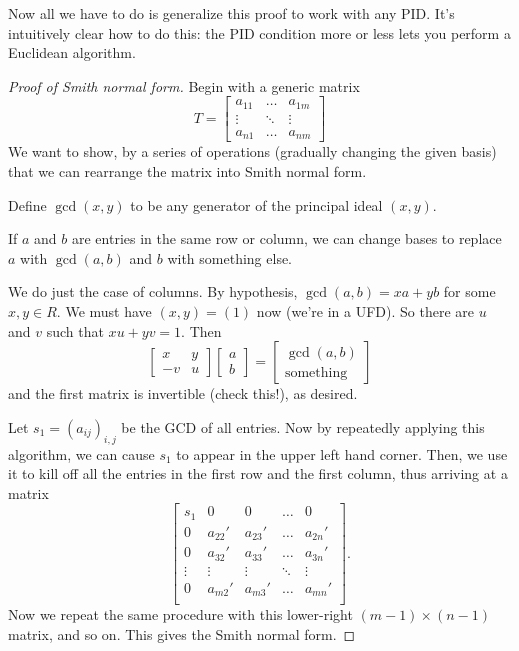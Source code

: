 Now all we have to do is generalize this proof to work
with any PID. It's intuitively clear how to do this:
the PID condition more or less lets you perform a Euclidean algorithm.

\begin{proof}
	[Proof of Smith normal form]
	Begin with a generic matrix
	\[ T = \begin{bmatrix}
		a_{11} & \dots & a_{1m} \\
		\vdots & \ddots & \vdots \\
		a_{n1} & \dots & a_{nm}
	\end{bmatrix} \]
	We want to show, by a series of operations (gradually changing the given basis)
	that we can rearrange the matrix into Smith normal form.

	Define $\gcd(x,y)$ to be any generator of the principal ideal $(x,y)$.
	\begin{claim}
		If $a$ and $b$ are entries in the same row or column,
		we can change bases to replace $a$ with $\gcd(a,b)$
		and $b$ with something else.
	\end{claim}
	\begin{subproof}
		We do just the case of columns.
		By hypothesis, $\gcd(a,b) = xa+yb$ for some $x,y \in R$.
		We must have $(x,y) = (1)$ now (we're in a UFD).
		So there are $u$ and $v$ such that $xu + yv = 1$.
		Then
		\[
			\begin{bmatrix} x & y \\ -v & u \end{bmatrix}
			\begin{bmatrix} a \\ b  \end{bmatrix}
			= \begin{bmatrix} \gcd(a,b) \\ \text{something} \end{bmatrix}
		\]
		and the first matrix is invertible (check this!), as desired.
	\end{subproof}
	Let $s_1 = (a_{ij})_{i,j}$ be the GCD of all entries.
	Now by repeatedly applying this algorithm,
	we can cause $s_1$ to appear in the upper left hand corner.
	Then, we use it to kill off all the entries in the first
	row and the first column, thus arriving at a matrix
	\[ \begin{bmatrix}
		s_1 & 0 & 0 & \dots & 0 \\
		0 & a_{22}' & a_{23}' & \dots & a_{2n}' \\
		0 & a_{32}' & a_{33}' & \dots & a_{3n}' \\
		\vdots&\vdots&\vdots&\ddots&\vdots \\
		0 & a_{m2}' & a_{m3}' & \dots & a_{mn}' \\
	\end{bmatrix}. \]
	Now we repeat the same procedure with this lower-right
	$(m-1) \times (n-1)$ matrix, and so on.
	This gives the Smith normal form.
\end{proof}

